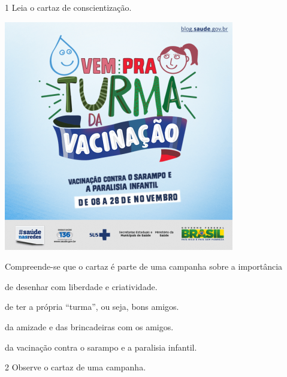 
\num{1} Leia o cartaz de conscientização.


\includegraphics[width=3.95833in,height=3.95833in]{./media/image12.png}


Compreende-se que o cartaz é parte de uma campanha sobre a importância

\begin{escolha}
\item de desenhar com liberdade e criatividade.

\item de ter a própria ``turma'', ou seja, bons amigos.

\item da amizade e das brincadeiras com os amigos.

\item da vacinação contra o sarampo e a paralisia infantil.
\end{escolha}

\num{2} Observe o cartaz de uma campanha.


